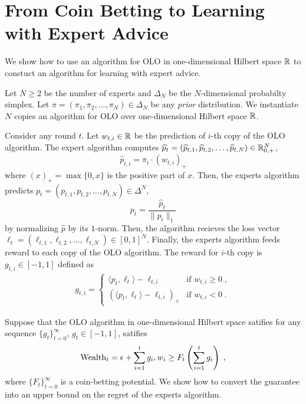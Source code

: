 \section{From Coin Betting to Learning with Expert Advice}
\label{section:reduction-experts}

We show how to use an algorithm for OLO in one-dimensional Hilbert space $\mathbb{R}$
to constuct an algorithm for learning with expert advice.

Let $N \ge 2$ be the number of experts and $\Delta_N$ be the $N$-dimensional
probabilty simplex. Let $\pi = (\pi_1, \pi_2, \dots, \pi_N) \in \Delta_N$ be any
\emph{prior} distribution. We instantiate $N$ copies an algorithm for OLO over
one-dimensional Hilbert space $\mathbb{R}$.

Consider any round $t$. Let $w_{t,i} \in \mathbb{R}$ be the prediction of $i$-th copy of
the OLO algorithm. The expert algorithm computes $\widehat p_t = (\widehat
p_{t,1}, \widehat p_{t,2}, \dots, \widehat p_{t,N}) \in \mathbb{R}_{0,+}^N$,
$$
\widehat p_{t,i} = \pi_i \cdot (w_{t,i})_+
$$
where $(x)_+ = \max\{0,x\}$ is the positive part of $x$. Then, the experts
algorithm predicts $p_t = (p_{t,1}, p_{t,2}, \dots, p_{t,N}) \in \Delta^N$,
$$
p_t = \frac{\widehat p_t}{\|\widehat p_t\|_1}
$$
by normalizing $\widehat p$ by its $1$-norm. Then, the algorithm recieves the
loss vector $\ell_t = (\ell_{t,1}, \ell_{t,2}, \dots, \ell_{t,N}) \in [0,1]^N$.
Finally, the experts algorithm feeds reward to each copy of the OLO algorithm.
The reward for $i$-th copy is $g_{t,i} \in [-1,1]$ defined as
\begin{align}
g_{t,i} =
\begin{cases}
\langle p_t, \ell_t\rangle - \ell_{t,i} & \text{if } w_{t,i} \ge 0 \; , \\
(\langle p_t, \ell_t\rangle - \ell_{t,i})_+ & \text{if } w_{t,i} < 0 \; .
\end{cases}
\end{align}

Suppose that the OLO algorithm in one-dimensional Hilbert space
satifies for any sequence $\{g_t\}_{t=0}^\infty$, $g_t \in [-1,1]$, satifies
\begin{equation}
\label{equation:experts-one-dimensional-assumption}
\operatorname{Wealth}_t = \epsilon + \sum_{i=1}^t g_i, w_i \ge F_t\left(\sum_{i=1}^t g_i\right) \; ,
\end{equation}
where $\{F_t\}_{t=0}^\infty$ is a coin-betting potential. We show how to convert
the guarantee into an upper bound on the regret of the experts algorithm.

